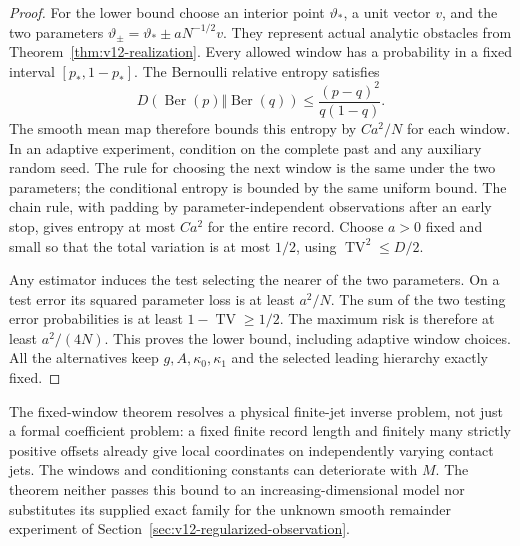 \begin{proof}
For the lower bound choose an interior point $\vartheta_*$, a unit
vector $v$, and the two parameters
$\vartheta_\pm=\vartheta_*\pm aN^{-1/2}v$.
They represent actual analytic obstacles from
Theorem~\ref{thm:v12-realization}. Every allowed window has a
probability in a fixed interval $[p_*,1-p_*]$. The Bernoulli
relative entropy satisfies
\[
 D(\operatorname{Ber}(p)\Vert\operatorname{Ber}(q))
       \le\frac{(p-q)^2}{q(1-q)}.
\]
The smooth mean map therefore bounds this entropy by $C a^2/N$
for each window. In an adaptive experiment, condition on the complete
past and any auxiliary random seed. The rule for choosing the next
window is the same under the two parameters; the conditional entropy
is bounded by the same uniform bound. The chain rule, with padding
by parameter-independent observations after an early stop, gives
entropy at most $Ca^2$ for the entire record. Choose $a>0$ fixed
and small so that the total variation is at most $1/2$, using
$\operatorname{TV}^2\le D/2$.

Any estimator induces the test selecting the nearer of the two
parameters. On a test error its squared parameter loss is at least
$a^2/N$. The sum of the two testing error probabilities is at least
$1-\operatorname{TV}\ge1/2$. The maximum risk is therefore at
least $a^2/(4N)$. This proves the lower bound, including adaptive
window choices. All the alternatives keep $g,A,\kappa_0,\kappa_1$
and the selected leading hierarchy exactly fixed.
\end{proof}

The fixed-window theorem resolves a physical finite-jet inverse
problem, not just a formal coefficient problem: a fixed finite record
length and finitely many strictly positive offsets already give local
coordinates on independently varying contact jets. The windows and
conditioning constants can deteriorate with $M$. The theorem neither
passes this bound to an increasing-dimensional model nor substitutes
its supplied exact family for the unknown smooth remainder experiment
of Section~\ref{sec:v12-regularized-observation}.
